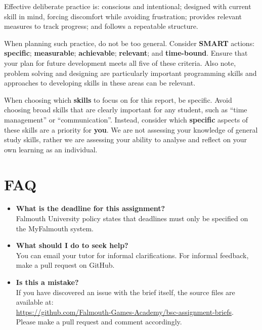 \documentclass{../fal_assignment}
\begin{document}
Effective deliberate practice is: conscious and intentional; designed with current skill in mind, forcing discomfort while avoiding frustration; provides relevant measures to track progress; and follows a repeatable structure.

When planning such practice, do not be too general. Consider \textbf{SMART} actions: \textbf{specific}; \textbf{measurable}; \textbf{achievable}; \textbf{relevant}; and \textbf{time-bound}. Ensure that your plan for future development meets all five of these criteria. Also note, problem solving and designing are particularly important programming skills and approaches to developing skills in these areas can be relevant.

When choosing which \textbf{skills} to focus on for this report, be specific. Avoid choosing broad skills that are clearly important for any student, such as ``time management'' or ``communication''. Instead, consider which \textbf{specific} aspects of these skills are a priority for \textbf{you}. We are not assessing your knowledge of general study skills, rather we are assessing your ability to analyse and reflect on your own learning as an individual.

\section*{FAQ}

\begin{itemize}
	\item 	\textbf{What is the deadline for this assignment?} \\ 
    		Falmouth University policy states that deadlines must only be specified on the MyFalmouth system.
    			    		    		
	\item 	\textbf{What should I do to seek help?} \\ 
    		You can email your tutor for informal clarifications. For informal feedback, make a pull request on GitHub. 
    		
    	\item 	\textbf{Is this a mistake?} \\ 	
    		If you have discovered an issue with the brief itself, the source files are available at: \\
    		\url{https://github.com/Falmouth-Games-Academy/bsc-assignment-briefs}.\\
    		 Please make a pull request and comment accordingly.
\end{itemize}
\end{document}
